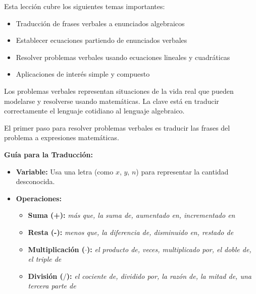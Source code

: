 


Esta lección cubre los siguientes temas importantes:

\begin{itemize}
    \item Traducción de frases verbales a enunciados algebraicos
    \item Establecer ecuaciones partiendo de enunciados verbales
    \item Resolver problemas verbales usando ecuaciones lineales y cuadráticas
    \item Aplicaciones de interés simple y compuesto
\end{itemize}

\medskip

Los problemas verbales representan situaciones de la vida real que pueden modelarse y resolverse usando matemáticas. La clave está en traducir correctamente el lenguaje cotidiano al lenguaje algebraico.


El primer paso para resolver problemas verbales es traducir las frases del problema a expresiones matemáticas.

\begin{definition}
\textbf{Guía para la Traducción:}

\begin{itemize}[leftmargin=*]
    \item \textbf{Variable:} Usa una letra (como $x$, $y$, $n$) para representar la cantidad desconocida.
    \item \textbf{Operaciones:}
    \begin{itemize}
        \item \textbf{Suma (+):} \textit{más que, la suma de, aumentado en, incrementado en}
        \item \textbf{Resta (-):} \textit{menos que, la diferencia de, disminuido en, restado de}
        \item \textbf{Multiplicación ($\cdot$):} \textit{el producto de, veces, multiplicado por, el doble de, el triple de}
        \item \textbf{División ($/$):} \textit{el cociente de, dividido por, la razón de, la mitad de, una tercera parte de}
    \end{itemize}
\end{itemize}
\end{definition}

